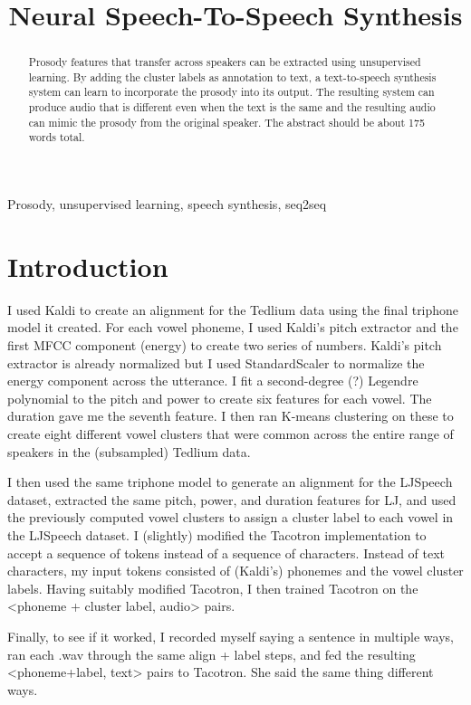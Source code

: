 \documentclass{article}
\title{Neural Speech-To-Speech Synthesis}
\begin{document}
%
\maketitle
%
\begin{abstract}
  Prosody features that transfer across speakers can be extracted using unsupervised learning. By adding the cluster labels as annotation to text, a text-to-speech synthesis system can learn to incorporate the prosody into its output. The resulting system can produce audio that is different even when the text is the same and the resulting audio can mimic the prosody from the original speaker. The abstract should be about 175 words total.
\end{abstract}
%
\begin{keywords}
Prosody, unsupervised learning, speech synthesis, seq2seq
\end{keywords}
%
\section{Introduction}
\label{sec:intro}

I used Kaldi to create an alignment for the Tedlium data using the final triphone model it created. For each vowel phoneme, I used Kaldi's pitch extractor and the first MFCC component (energy) to create two series of numbers. Kaldi's pitch extractor is already normalized but I used StandardScaler to normalize the energy component across the utterance. I fit a second-degree (?) Legendre polynomial to the pitch and power to create six features for each vowel. The duration gave me the seventh feature. I then ran K-means clustering on these to create eight different vowel clusters that were common across the entire range of speakers in the (subsampled) Tedlium data.

I then used the same triphone model to generate an alignment for the LJSpeech dataset, extracted the same pitch, power, and duration features for LJ, and used the previously computed vowel clusters to assign a cluster label to each vowel in the LJSpeech dataset. I (slightly) modified the Tacotron implementation to accept a sequence of tokens instead of a sequence of characters. Instead of text characters, my input tokens consisted of (Kaldi's) phonemes and the vowel cluster labels. Having suitably modified Tacotron, I then trained Tacotron on the <phoneme + cluster label, audio> pairs.

Finally, to see if it worked, I recorded myself saying a sentence in multiple ways, ran each .wav through the same align + label steps, and fed the resulting <phoneme+label, text> pairs to Tacotron. She said the same thing different ways.
\end{document}
